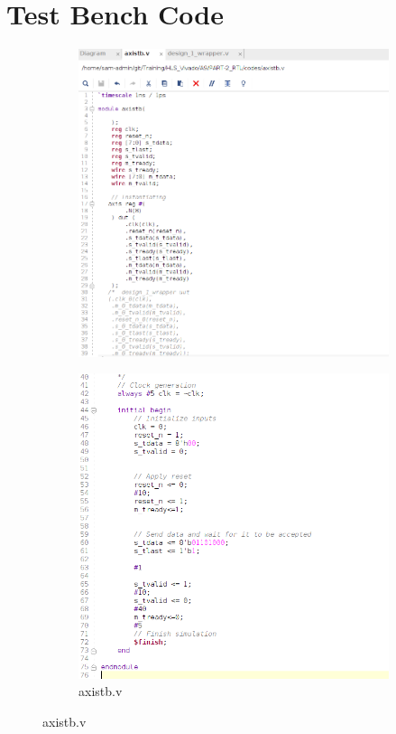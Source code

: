 \documentclass{article}
\begin{document}
\section{Test Bench Code}
\begin{figure}[h]
\centering
\begin{subfigure}[b]{0.56\textwidth}
    \centering
\includegraphics[width=\textwidth]{figs/p2tbrtl1.png}
    \label{fig:my_label}
\end{subfigure}
\hfill
\begin{subfigure}[b]{0.56\textwidth}
    \centering
\includegraphics[width=\textwidth]{figs/p2tbrtl2.png}
    \caption{axistb.v}
    \label{fig:my_label}
\end{subfigure}
\end{figure}
\end{document}
